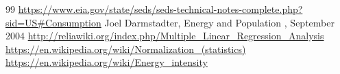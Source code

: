 \documentclass{mcmthesis}
\begin{document}
\begin{thebibliography} {99}
  \url{https://www.eia.gov/state/seds/seds-technical-notes-complete.php?sid=US#Consumption}
   Joel Darmstadter,  Energy and Population , September 2004
  \url{http://reliawiki.org/index.php/Multiple_Linear_Regression_Analysis}
  \url{https://en.wikipedia.org/wiki/Normalization_(statistics)}
  \url{https://en.wikipedia.org/wiki/Energy_intensity}
\end{thebibliography}
\end{document}
